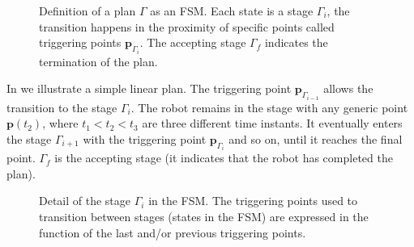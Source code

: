 \begin{figure}[h!]
  \center
  \caption[Definition of a plan]{Definition of a plan $\Gamma$ as an FSM. Each state is a stage $\Gamma_i$, the transition happens in the proximity of specific points called triggering points $\mathbf{p}_{\Gamma_i}$. The accepting stage $\Gamma_f$ indicates the termination of the plan.}
  \label{fig:state-machine}
\end{figure}
In  we illustrate a simple linear plan. The triggering point $\mathbf{p}_{\Gamma_{i-1}}$ allows the transition to the stage $\Gamma_i$. The robot remains in the stage with any generic point $\mathbf{p}(t_2)$, where $t_1<t_2<t_3$ are three different time instants. It eventually enters the stage $\Gamma_{i+1}$ with the triggering point $\mathbf{p}_{\Gamma_i}$ and so on, until it reaches the final point. $\Gamma_f$ is the accepting stage (it indicates that the robot has completed the plan).
\begin{figure}[h!]
  \center
\caption[Detail of a stage in the FSM]{Detail of the stage $\Gamma_i$ in the FSM. The triggering points used to transition between stages (states in the FSM) are expressed in the function of the last and/or previous triggering points.}
\label{fig:state-machine2}
\end{figure}
